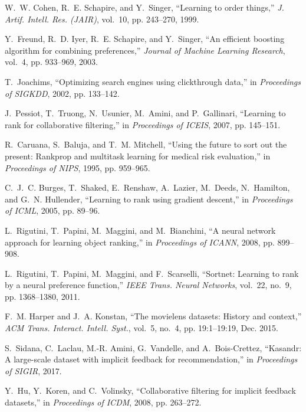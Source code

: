 \documentclass[10pt,journal,compsoc]{IEEEtran}
\begin{document}
\begin{sloppypar}
\begin{thebibliography}{10}
W.~W. Cohen, R.~E. Schapire, and Y.~Singer, ``Learning to order things,''
  \emph{J. Artif. Intell. Res. {(JAIR)}}, vol.~10, pp. 243--270, 1999.

Y.~Freund, R.~D. Iyer, R.~E. Schapire, and Y.~Singer, ``An efficient boosting
  algorithm for combining preferences,'' \emph{Journal of Machine Learning
  Research}, vol.~4, pp. 933--969, 2003.

T.~Joachims, ``Optimizing search engines using clickthrough data,'' in
  \emph{Proceedings of {SIGKDD}}, 2002, pp. 133--142.

J.~Pessiot, T.~Truong, N.~Usunier, M.~Amini, and P.~Gallinari, ``Learning to
  rank for collaborative filtering,'' in \emph{Proceedings of {ICEIS}}, 2007,
  pp. 145--151.

R.~Caruana, S.~Baluja, and T.~M. Mitchell, ``Using the future to sort out the
  present: Rankprop and multitask learning for medical risk evaluation,'' in
  \emph{Proceedings of NIPS}, 1995, pp. 959--965.

C.~J.~C. Burges, T.~Shaked, E.~Renshaw, A.~Lazier, M.~Deeds, N.~Hamilton, and
  G.~N. Hullender, ``Learning to rank using gradient descent,'' in
  \emph{Proceedings of ICML}, 2005, pp. 89--96.

L.~Rigutini, T.~Papini, M.~Maggini, and M.~Bianchini, ``A neural network
  approach for learning object ranking,'' in \emph{Proceedings of {ICANN}},
  2008, pp. 899--908.

L.~Rigutini, T.~Papini, M.~Maggini, and F.~Scarselli, ``Sortnet: Learning to
  rank by a neural preference function,'' \emph{{IEEE} Trans. Neural Networks},
  vol.~22, no.~9, pp. 1368--1380, 2011.

F.~M. Harper and J.~A. Konstan, ``The movielens datasets: History and
  context,'' \emph{ACM Trans. Interact. Intell. Syst.}, vol.~5, no.~4, pp.
  19:1--19:19, Dec. 2015.

S.~Sidana, C.~Laclau, M.-R. Amini, G.~Vandelle, and A.~Bois-Crettez, ``Kasandr:
  A large-scale dataset with implicit feedback for recommendation,'' in
  \emph{Proceedings of {SIGIR}}, 2017.

Y.~Hu, Y.~Koren, and C.~Volinsky, ``Collaborative filtering for implicit
  feedback datasets,'' in \emph{Proceedings of {ICDM}}, 2008, pp. 263--272.


\end{thebibliography}
\end{sloppypar}
\end{document}
